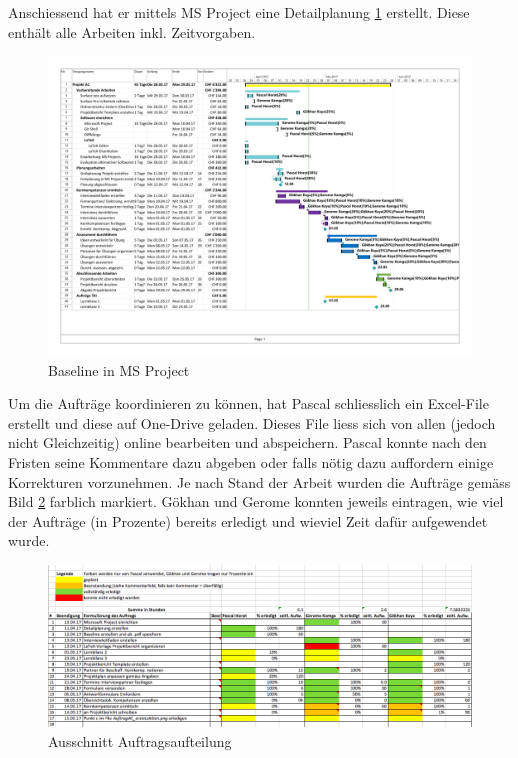 Anschiessend hat er mittels MS Project eine Detailplanung \ref{fig:msproject} erstellt. Diese enthält alle Arbeiten inkl. Zeitvorgaben.

\begin{figure}[ht]
	\centering
	\includegraphics[width=1.6\textwidth, angle =270]{images/BaselineAC2.pdf}
	\caption{Baseline in MS Project}
	\label{fig:msproject}
\end{figure}

Um die Aufträge koordinieren zu können, hat Pascal schliesslich ein Excel-File erstellt und diese auf One-Drive geladen. Dieses File liess sich von allen (jedoch nicht Gleichzeitig) online bearbeiten und abspeichern. Pascal konnte nach den Fristen seine Kommentare dazu abgeben oder falls nötig dazu auffordern einige Korrekturen vorzunehmen. Je nach Stand der Arbeit wurden die Aufträge gemäss Bild \ref{fig:auftrage} farblich markiert. Gökhan und Gerome konnten jeweils eintragen, wie viel der Aufträge (in Prozente) bereits erledigt und wieviel Zeit dafür aufgewendet wurde. 

\begin{figure}[ht]
	\centering
	\includegraphics[width=1.1\textwidth]{images/Auftrage}
	\caption{Ausschnitt Auftragsaufteilung}
	\label{fig:auftrage}
\end{figure}

